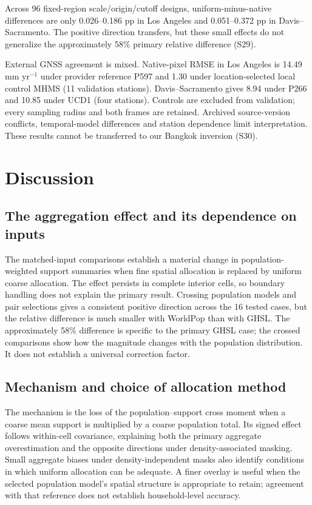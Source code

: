 \documentclass[pdflatex,lineno,sn-nature]{sn-jnl}
\begin{document}
Across 96 fixed-region scale/origin/cutoff designs, uniform-minus-native differences are only 0.026--0.186 pp in Los Angeles and 0.051--0.372 pp in Davis--Sacramento. The positive direction transfers, but these small effects do not generalize the approximately 58\% primary relative difference (S29).

External GNSS agreement is mixed. Native-pixel RMSE in Los Angeles is 14.49 mm yr$^{-1}$ under provider reference P597 and 1.30 under location-selected local control MHMS (11 validation stations). Davis--Sacramento gives 8.94 under P266 and 10.85 under UCD1 (four stations). Controls are excluded from validation; every sampling radius and both frames are retained. Archived source-version conflicts, temporal-model differences and station dependence limit interpretation. These results cannot be transferred to our Bangkok inversion (S30).

\FloatBarrier
\section{Discussion}
\subsection{The aggregation effect and its dependence on inputs}
The matched-input comparisons establish a material change in population-weighted support summaries when fine spatial allocation is replaced by uniform coarse allocation. The effect persists in complete interior cells, so boundary handling does not explain the primary result. Crossing population models and pair selections gives a consistent positive direction across the 16 tested cases, but the relative difference is much smaller with WorldPop than with GHSL. The approximately 58\% difference is specific to the primary GHSL case; the crossed comparisons show how the magnitude changes with the population distribution. It does not establish a universal correction factor.

\subsection{Mechanism and choice of allocation method}
The mechanism is the loss of the population--support cross moment when a coarse mean support is multiplied by a coarse population total. Its signed effect follows within-cell covariance, explaining both the primary aggregate overestimation and the opposite directions under density-associated masking. Small aggregate biases under density-independent masks also identify conditions in which uniform allocation can be adequate. A finer overlay is useful when the selected population model's spatial structure is appropriate to retain; agreement with that reference does not establish household-level accuracy.
\end{document}

